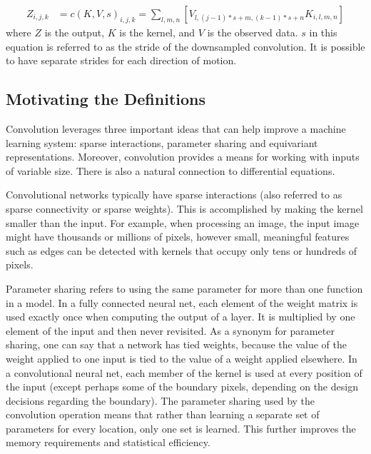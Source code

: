 \documentclass[book.tex]{subfiles}
\begin{document}
\begin{align}
Z_{i,j,k} &= c(K,V,s)_{i,j,k} = \sum_{l,m,n}[V_{l,(j-1)*s+m,(k-1)*s+n}K_{i,l,m,n}]
\end{align}
where $Z$ is the output, $K$ is the kernel, and $V$ is the observed data. $s$ in this equation is referred to as the stride of the downsampled convolution. It is possible to have separate strides for each direction of motion.

\subsection{Motivating the Definitions} 
Convolution leverages three important ideas that can help improve a machine learning system: sparse interactions, parameter sharing and equivariant representations. Moreover, convolution provides a means for working with inputs of variable size.  There is also a natural connection to differential equations.

Convolutional networks typically have sparse interactions (also referred to as sparse connectivity or sparse weights). This is accomplished by making the kernel smaller than the input. For example, when processing an image, the input image might have thousands or millions of pixels, however small, meaningful features such as edges can be detected with kernels that occupy only tens or hundreds of pixels. 

Parameter sharing refers to using the same parameter for more than one function in a model. In a fully connected neural net, each element of the weight matrix is used exactly once when computing the output of a layer. It is multiplied by one element of the input and then never revisited. As a synonym for parameter sharing, one can say that a network has tied weights, because the value of the weight applied to one input is tied to the value of a weight applied elsewhere. In a convolutional neural net, each member of the kernel is used at every position of the input (except perhaps some of the boundary pixels, depending on the design decisions regarding the boundary). The parameter sharing used by the convolution operation means that rather than learning a separate set of parameters for every location, only one set is learned. This further improves the memory requirements and statistical efficiency.
\end{document}
